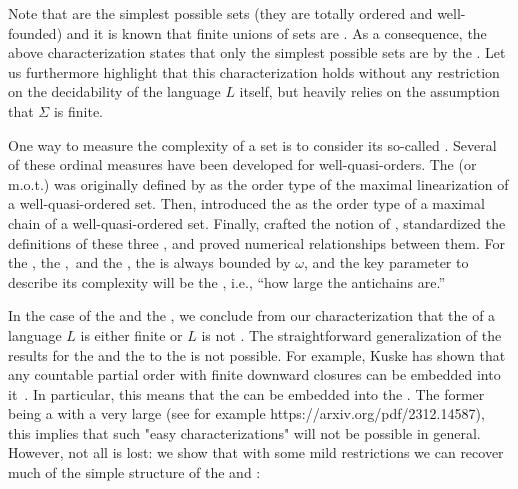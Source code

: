 Note that  are the simplest possible
 sets (they are totally ordered and well-founded) and it
is known that finite unions of  sets are
. As a consequence, the above characterization states
that only the simplest possible  sets are
 by the . Let us furthermore
highlight that this characterization holds without any restriction on the
decidability of the language $L$ itself, but heavily relies on the assumption
that $\Sigma$ is finite. 

\AP One way to measure the complexity of a  set is to
consider its so-called . Several of these ordinal
measures have been developed for well-quasi-orders. The  (or m.o.t.) was originally defined by \cite{dejongh77} as the order type
of the maximal linearization of a well-quasi-ordered set. Then,
\cite{schmidt81} introduced the  as the order type of a
maximal chain of a well-quasi-ordered set. Finally, \cite{kriz90b} crafted the
notion of , standardized the definitions of these three
, and proved numerical relationships between them. For
the , the , and the , the  is always bounded by $\omega$, and the key
parameter to describe its complexity will be the , i.e.,
``how large the antichains are.''

\AP In the case of the  and the , we
conclude from our characterization that the  of a language
$L$ is either finite or $L$ is not . The straightforward
generalization of the results for the  and the  to the  is not possible. For example, Kuske has
shown that any countable partial order with finite downward closures can be
embedded into it~\cite{DBLP:journals/ita/Kuske06}. In particular, this means
that the  can be embedded into the .
The former being a  with a very large 
(see for example https://arxiv.org/pdf/2312.14587), this implies that such
"easy characterizations" will not be possible in general. However, not all is
lost: we show that with some mild restrictions we can recover much of the
simple structure of the  and :


